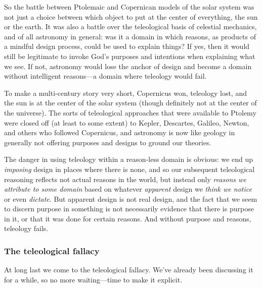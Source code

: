 		So the battle between Ptolemaic and Copernican models of the solar system was not just a choice between which object to put at the center of everything, the sun or the earth. It was also a battle over the teleological basis of celestial mechanics, and of all astronomy in general: was it a domain in which reasons, as products of a mindful design process, could be used to explain things? If yes, then it would still be legitimate to invoke God's purposes and intentions when explaining what we see. If not, astronomy would lose the anchor of design and become a domain without intelligent reasons---a domain where teleology would fail.
		
		To make a multi-century story very short, Copernicus won, teleology lost, and the sun is at the center of the solar system (though definitely not at the center of the universe). The sorts of teleological approaches that were available to Ptolemy were closed off (at least to some extent) to Kepler, Descartes, Galileo, Newton, and others who followed Copernicus, and astronomy is now like geology in generally not offering purposes and designs to ground our theories.
		
		
		The danger in using teleology within a reason-less domain is obvious: we end up \textit{imposing} design in places where there is none, and so our subsequent teleological reasoning reflects not actual reasons in the world, but instead only \textit{reasons we attribute to some domain} based on whatever \textit{apparent} design we \textit{think we notice} or even \textit{dictate}. But apparent design is not real design, and the fact that we seem to discern purpose in something is not necessarily evidence that there is purpose in it, or that it was done for certain reasons. And without purpose and reasons, teleology fails.
		
	\subsubsection{The teleological fallacy}
	
		At long last we come to the teleological fallacy. We've already been discussing it for a while, so no more waiting---time to make it explicit.
		
